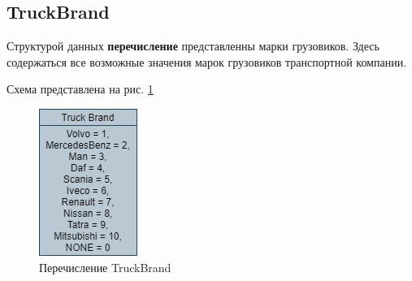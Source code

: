 \subsection{TruckBrand}

Структурой данных \textbf{перечисление} представленны марки грузовиков.
Здесь содержаться все возможные значения марок грузовиков транспортной компании. 

Схема представлена на рис. \ref{truck_brand}

\begin{figure}[hpt!]
    \centering
    \includegraphics[width=0.2\linewidth]{photo/data_structures/truck_brand}
    \caption{Перечисление TruckBrand}
    \label{truck_brand}
\end{figure}

